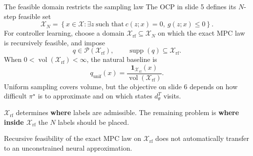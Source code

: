 \documentclass[aspectratio=169,10pt]{beamer}
\newcommand{\Xr}{\mathcal{X}_{\mathrm{rf}}}
\begin{document}
\begin{frame}{The feasible domain restricts the sampling law}
The OCP in slide 5 defines its $N$-step feasible set
\[
  \mathcal X_N=\left\{x\in\mathcal X:\exists z\ \text{such that}\ c(z;x)=0,\ g(z;x)\le0\right\}.
\]
For controller learning, choose a domain $\Xr\subseteq\mathcal X_N$ on which the exact MPC law is recursively feasible, and impose
\[
  q\in\mathcal P(\Xr),\qquad \operatorname{supp}(q)\subseteq\Xr.
\]
When $0<\operatorname{vol}(\Xr)<\infty$, the natural baseline is
\[
  q_{\mathrm{unif}}(x)=\frac{\mathbf 1_{\Xr}(x)}{\operatorname{vol}(\Xr)}.
\]
Uniform sampling covers volume, but the objective on slide 6 depends on how difficult $\pi^\star$ is to approximate and on which states $d_\theta^T$ visits.

\vspace{0.2cm}
\colorbox{PaleGold}{\parbox{0.9\textwidth}{\centering
$\Xr$ determines \textbf{where} labels are admissible. The remaining problem is \textbf{where inside $\Xr$} the $N$ labels should be placed.}}

\color{Slate}\scriptsize Recursive feasibility of the exact MPC law on $\Xr$ does not automatically transfer to an unconstrained neural approximation.
\end{frame}
\end{document}
